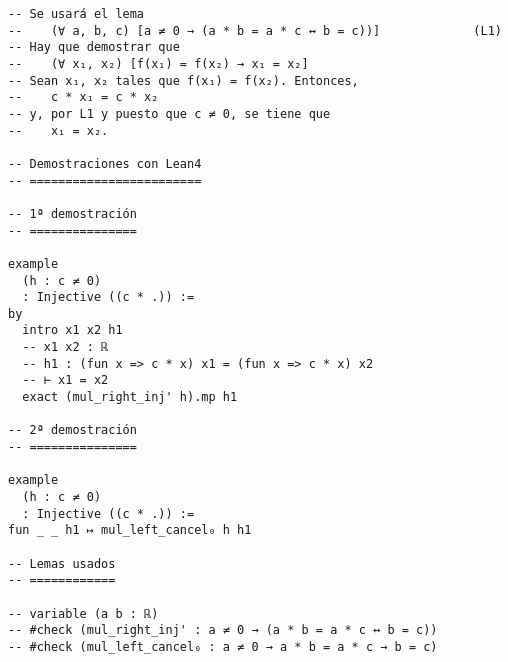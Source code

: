 \begin{verbatim}
-- Se usará el lema
--    (∀ a, b, c) [a ≠ 0 → (a * b = a * c ↔ b = c))]             (L1)
-- Hay que demostrar que
--    (∀ x₁, x₂) [f(x₁) = f(x₂) → x₁ = x₂]
-- Sean x₁, x₂ tales que f(x₁) = f(x₂). Entonces,
--    c * x₁ = c * x₂
-- y, por L1 y puesto que c ≠ 0, se tiene que
--    x₁ = x₂.

-- Demostraciones con Lean4
-- ========================

-- 1ª demostración
-- ===============

example
  (h : c ≠ 0)
  : Injective ((c * .)) :=
by
  intro x1 x2 h1
  -- x1 x2 : ℝ
  -- h1 : (fun x => c * x) x1 = (fun x => c * x) x2
  -- ⊢ x1 = x2
  exact (mul_right_inj' h).mp h1

-- 2ª demostración
-- ===============

example
  (h : c ≠ 0)
  : Injective ((c * .)) :=
fun _ _ h1 ↦ mul_left_cancel₀ h h1

-- Lemas usados
-- ============

-- variable (a b : ℝ)
-- #check (mul_right_inj' : a ≠ 0 → (a * b = a * c ↔ b = c))
-- #check (mul_left_cancel₀ : a ≠ 0 → a * b = a * c → b = c)
\end{verbatim}

